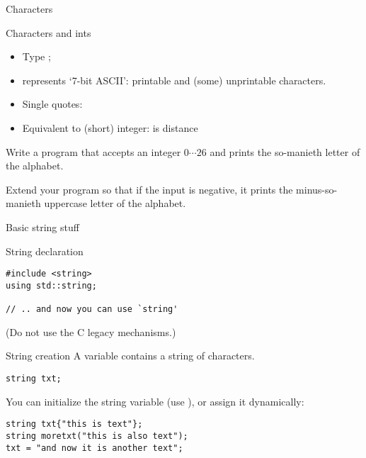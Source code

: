 
 {Characters}

\begin{block}{Characters and ints}
  \label{sl:int-char}
  \begin{itemize}
  \item Type ;
  \item represents `7-bit ASCII': printable and (some) unprintable
    characters.
  \item Single quotes: 
  \item Equivalent to (short) integer:  is distance 
  \end{itemize}
\end{block}

\begin{exercise}
  \label{ex:print-ichar}
  Write a program that accepts an integer $0\cdots26$ and prints the
  so-manieth letter of the alphabet.

  Extend your program so that if the input is negative, it prints the
  minus-so-manieth uppercase letter of the alphabet.
\end{exercise}

 {Basic string stuff}
\label{sec:string}

\begin{block}{String declaration}
  \label{sl:string-declare}
\begin{verbatim}
#include <string>
using std::string;

// .. and now you can use `string'
\end{verbatim}
(Do not use the C legacy mechanisms.)
\end{block}

\begin{block}{String creation}
  \label{sl:string-create}
  A  variable contains a string of characters.
\begin{verbatim}
string txt;
\end{verbatim}
You can initialize the string variable (use ), or assign it dynamically:
\begin{verbatim}
string txt{"this is text"};
string moretxt("this is also text");
txt = "and now it is another text";
\end{verbatim}
\end{block}

